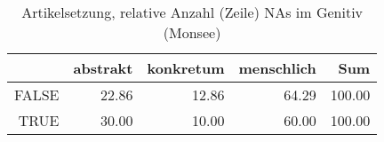 \begin{table}[ht]
\centering
\begin{tabular}{rrrrr}
  \hline
 & abstrakt & konkretum & menschlich & Sum \\ 
  \hline
FALSE & 22.86 & 12.86 & 64.29 & 100.00 \\ 
  TRUE & 30.00 & 10.00 & 60.00 & 100.00 \\ 
   \hline
\end{tabular}
\caption{Artikelsetzung, relative Anzahl (Zeile) NAs im Genitiv (Monsee)} 
\end{table}

